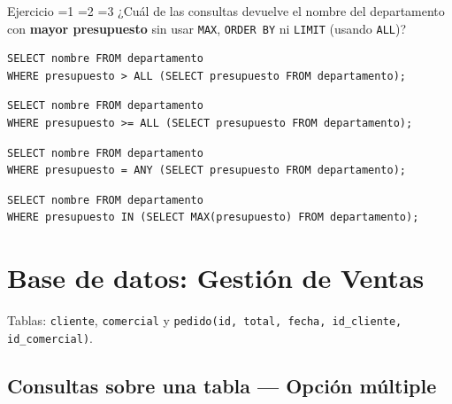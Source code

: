 \documentclass[12pt, a4paper]{article}
\newcommand{\estrella}{{\color{Goldenrod}\faStarSolid}}
\newcommand{\estrellavacia}{{\color{gray!45}\faStarSolid}}
\newcommand{\nivel}[1]{%
  \ifnum#1=1\estrella\estrellavacia\estrellavacia\fi
  \ifnum#1=2\estrella\estrella\estrellavacia\fi
  \ifnum#1=3\estrella\estrella\estrella\fi
}
\newcounter{numej}
\newcommand{\ej}{\stepcounter{numej}\thenumej}
\begin{document}
\begin{ejercicio}{Ejercicio \ej}{\nivel{3}}
¿Cuál de las consultas devuelve el nombre del departamento con
\textbf{mayor presupuesto} sin usar \texttt{MAX}, \texttt{ORDER BY}
ni \texttt{LIMIT} (usando \texttt{ALL})?

\begin{opciones}
  \item
\begin{lstlisting}
SELECT nombre FROM departamento
WHERE presupuesto > ALL (SELECT presupuesto FROM departamento);
\end{lstlisting}
  \item
\begin{lstlisting}
SELECT nombre FROM departamento
WHERE presupuesto >= ALL (SELECT presupuesto FROM departamento);
\end{lstlisting}
  \item
\begin{lstlisting}
SELECT nombre FROM departamento
WHERE presupuesto = ANY (SELECT presupuesto FROM departamento);
\end{lstlisting}
  \item
\begin{lstlisting}
SELECT nombre FROM departamento
WHERE presupuesto IN (SELECT MAX(presupuesto) FROM departamento);
\end{lstlisting}
\end{opciones}
\end{ejercicio}

\section{Base de datos: Gestión de Ventas}

\begin{nota}
Tablas: \texttt{cliente}, \texttt{comercial} y
\texttt{pedido(id, total, fecha, id\_cliente, id\_comercial)}.
\end{nota}

\subsection{Consultas sobre una tabla — Opción múltiple}
\end{document}
